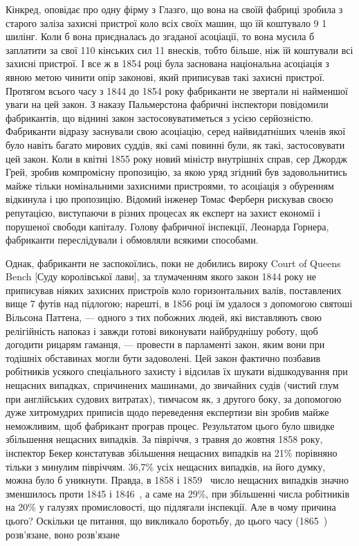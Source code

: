 \parcont{}  %
Кінкред, оповідає про одну фірму з Глазго, що вона на своїй
фабриці зробила з старого заліза захисні пристрої коло всіх
своїх машин, що їй коштувало 9 1 шилінг.
Коли б вона приєдналась до згаданої асоціації, то вона мусила б
заплатити за свої 110 кінських сил 11 внесків,
тобто більше, ніж їй коштували всі захисні пристрої. І все ж
в 1854 році була заснована національна асоціація з явною метою
чинити опір законові, який приписував такі захисні пристрої.
Протягом всього часу з 1844 до 1854 року фабриканти не звертали
ні найменшої уваги на цей закон. З наказу Пальмерстона
фабричні інспектори повідомили фабрикантів, що віднині закон
застосовуватиметься з усією серйозністю. Фабриканти відразу
заснували свою асоціацію, серед найвидатніших членів якої було
навіть багато мирових суддів, які самі повинні були, як такі, застосовувати цей закон. Коли в квітні
1855 року новий міністр
внутрішніх справ, сер Джордж Грей, зробив компромісну пропозицію, за якою уряд згідний був
задовольнитись майже тільки
номінальними захисними пристроями, то асоціація з обуренням
відкинула і цю пропозицію. Відомий інженер Томас Ферберн
рискував своєю репутацією, виступаючи в різних процесах як
експерт на захист економії і порушеної свободи капіталу. Голову
фабричної інспекції, Леонарда Горнера, фабриканти переслідували і обмовляли всякими способами.

Однак, фабриканти не заспокоїлись, поки не добились вироку
Court of Queens Bench [Суду королівської лави], за тлумаченням
якого закон 1844 року не приписував ніяких захисних пристроїв коло горизонтальних валів, поставлених
вище 7 футів над
підлогою; нарешті, в 1856 році їм удалося з допомогою святоші
Вільсона Паттена, — одного з тих побожних людей, які виставляють
свою релігійність напоказ і завжди готові виконувати найбруднішу
роботу, щоб догодити рицарям гаманця, — провести в парламенті
закон, яким вони при тодішніх обставинах могли бути задоволені.
Цей закон фактично позбавив робітників усякого спеціального захисту і відсилав їх шукати
відшкодування при нещасних випадках,
спричинених машинами, до звичайних судів (чистий глум при
англійських судових витратах), тимчасом як, з другого боку,
за допомогою дуже хитромудрих приписів щодо переведення
експертизи він зробив майже неможливим, щоб фабрикант програв процес. Результатом цього було швидке
збільшення нещасних випадків. За півріччя, з травня до жовтня 1858 року,
інспектор Бекер констатував збільшення нещасних випадків на
21\% порівняно тільки з минулим півріччям. 36,7\% усіх нещасних
випадків, на його думку, можна було б уникнути. Правда,
в 1858 і 1859~ число нещасних випадків значно зменшилось
проти 1845 і 1846~, а саме на 29\%, при збільшенні числа робітників на 20\% у галузях
промисловості, що підлягали інспекції.
Але в чому причина цього? Оскільки це питання, що викликало
боротьбу, до цього часу (1865~) розв’язане, воно розв’язане
\parbreak{}  %
